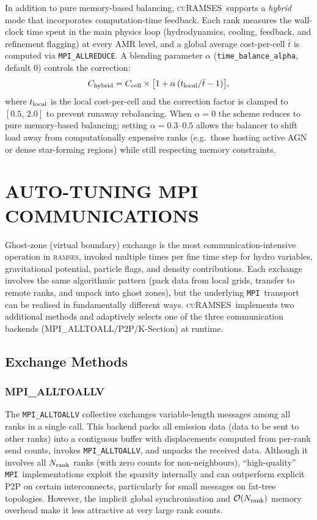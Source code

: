 \documentclass[fleqn,usenatbib]{mnras}
\newcommand{\ramses}{\textsc{ramses}}
\newcommand{\curamses}{\textsc{cuRAMSES}}
\newcommand{\nrank}{N_{\rm rank}}
\newcommand{\Olog}[1]{\mathcal{O}(#1)}
\newcommand{\code}[1]{\texttt{#1}}
\newcommand{\mpi}[0]{\texttt{MPI}}
\begin{document}
In addition to pure memory-based balancing, \curamses\ supports a
\emph{hybrid} mode that incorporates computation-time feedback.  Each
rank measures the wall-clock time spent in the main physics loop
(hydrodynamics, cooling, feedback, and refinement flagging) at every
AMR level, and a global average cost-per-cell $\bar{t}$ is computed
via \code{MPI\_ALLREDUCE}.  A blending parameter $\alpha$
(\code{time\_balance\_alpha}, default 0) controls the correction:
\begin{equation}
C_{\rm hybrid} = C_{\rm cell} \times
\bigl[1 + \alpha\,(t_{\rm local}/\bar{t} - 1)\bigr],
\label{eq:hybrid_cost}
\end{equation}
where $t_{\rm local}$ is the local cost-per-cell and the correction
factor is clamped to $[0.5,\,2.0]$ to prevent runaway rebalancing.
When $\alpha = 0$ the scheme reduces to pure memory-based balancing;
setting $\alpha = 0.3$--$0.5$ allows the balancer to shift load away
from computationally expensive ranks (e.g.\ those hosting active AGN
or dense star-forming regions) while still respecting memory
constraints.


\section{AUTO-TUNING MPI COMMUNICATIONS}
\label{sec:ksec_exchange}

Ghost-zone (virtual boundary) exchange is the most
communication-intensive operation in \ramses, invoked multiple times
per fine time step for hydro variables, gravitational potential,
particle flags, and density contributions. Each exchange involves
the same algorithmic pattern (pack data from local grids, transfer to
remote ranks, and unpack into ghost zones), but the underlying \mpi\
transport can be realised in fundamentally different ways.
\curamses\ implements two additional methods and adaptively selects one of the three communication backends (MPI\_ALLTOALL/P2P/K-Section) at runtime.

\subsection{Exchange Methods}
\label{sec:exchange_backends}

\subsubsection{MPI\_ALLTOALLV}
\label{sec:backend_alltoall}

The \code{MPI\_ALLTOALLV} collective exchanges variable-length
messages among all ranks in a single call. This backend packs all
emission data (data to be sent to other ranks) into a contiguous buffer with displacements computed
from per-rank send counts, invokes \code{MPI\_ALLTOALLV}, and unpacks
the received data. Although it involves all $\nrank$ ranks (with zero
counts for non-neighbours), ``high-quality'' \mpi\ implementations exploit
the sparsity internally and can outperform explicit P2P on certain
interconnects, particularly for small messages on fat-tree topologies.
However, the implicit global synchronisation and $\Olog{\nrank}$ memory
overhead make it less attractive at very large rank counts.
\end{document}
